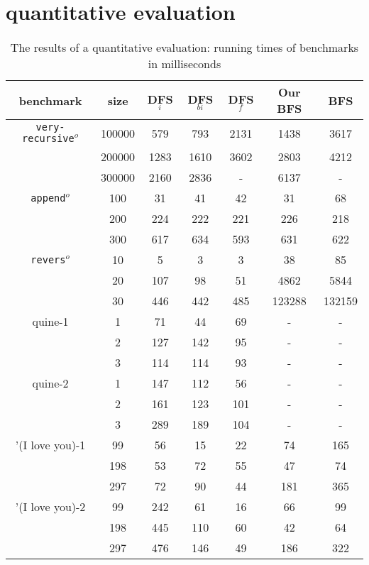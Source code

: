 \documentclass[format=acmlarge, review=true, authordraft=true]{acmart}
\newcommand{\veryrecursiveo}{\texttt{very-recursive$^o$}}
\newcommand{\appendo}{\texttt{append$^o$}}
\newcommand{\reverso}{\texttt{revers$^o$}}
\newcommand{\DFSi }[0]{DFS$_{i}$}
\newcommand{\DFSf }[0]{DFS$_{f}$}
\newcommand{\DFSbi}[0]{DFS$_{bi}$}
\newcommand{\BFSser}[0]{BFS}
\newcommand{\BFSimp}[0]{Our BFS}
\begin{document}

\section{quantitative evaluation}
\label{sec:quan}

\begin{table}
	\begin{tabular}{|c|c|c|c|c|c|c|}
		\hline 
		benchmark & size & \DFSi{} & \DFSbi{} & \DFSf{} & 
		\BFSimp{} & \BFSser{}  
		\\
		\hline
		\veryrecursiveo & 100000 &  579 &  793 & 2131 & 1438 & 3617 \\
		& 200000 & 1283 & 1610 & 3602 & 2803 & 4212 \\
		& 300000 & 2160 & 2836 &    - & 6137 &    - \\
		\hline 
		\appendo  & 100 &  31 &  41 &  42 &  31 &  68 \\ 
		& 200 & 224 & 222 & 221 & 226 & 218 \\ 
		& 300 & 617 & 634 & 593 & 631 & 622 \\ 
		\hline 
		\reverso & 10 &   5 &   3 &   3 &     38 &     85 \\ 
		& 20 & 107 &  98 &  51 &   4862 &   5844 \\
		& 30 & 446 & 442 & 485 & 123288 & 132159 \\ 
		\hline
		quine-1 & 1 &  71 &  44 & 69 & - & - \\ 
		& 2 & 127 & 142 & 95 & - & - \\ 
		& 3 & 114 & 114 & 93 & - & - \\ 
		\hline
		quine-2 & 1 & 147 & 112 &  56 & - & - \\ 
		& 2 & 161 & 123 & 101 & - & - \\ 
		& 3 & 289 & 189 & 104 & - & - \\ 
		\hline 
		'(I love you)-1 &  99 & 56 & 15 & 22 &  74 & 165 \\ 
		& 198 & 53 & 72 & 55 &  47 &  74 \\
		& 297 & 72 & 90 & 44 & 181 & 365 \\ 
		\hline
		'(I love you)-2 &  99 & 242 &  61 & 16 &  66 &  99 \\ 
		& 198 & 445 & 110 & 60 &  42 &  64 \\
		& 297 & 476 & 146 & 49 & 186 & 322 \\ 
		\hline 
	\end{tabular}
	\caption{The results of a quantitative evaluation: running times of 
	benchmarks 
		in milliseconds}
	\label{compare-efficiency}
\end{table}
\end{document}
